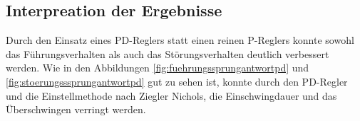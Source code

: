 \documentclass[12pt,a4paper]{article}
\begin{document}
\subsection{Interpreation der Ergebnisse}
Durch den Einsatz eines PD-Reglers statt einen reinen P-Reglers konnte sowohl das Führungsverhalten als auch das Störungsverhalten deutlich verbessert werden. Wie in den Abbildungen \ref{fig:fuehrungssprungantwortpd} und \ref{fig:stoerungsssprungantwortpd} gut zu sehen ist, konnte durch den PD-Regler und die Einstellmethode nach Ziegler Nichols, die Einschwingdauer und das Überschwingen verringt werden.


	
	
\end{document}
